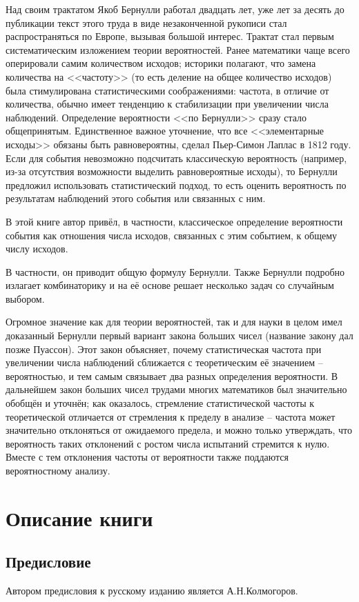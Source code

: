 \documentclass[12pt]{extarticle}
\begin{document}
Над своим трактатом Якоб Бернулли работал двадцать лет, уже лет за десять до публикации текст этого труда в виде незаконченной рукописи стал распространяться по Европе, вызывая большой интерес. 
Трактат стал первым систематическим изложением теории вероятностей. 
Ранее математики чаще всего оперировали самим количеством исходов; историки полагают, что замена количества на <<частоту>> (то есть деление на общее количество исходов) была стимулирована статистическими соображениями: частота, в отличие от количества, обычно имеет тенденцию к стабилизации при увеличении числа наблюдений. Определение вероятности <<по Бернулли>> сразу стало общепринятым.
Единственное важное уточнение, что все <<элементарные исходы>> обязаны быть равновероятны, сделал Пьер-Симон Лаплас в 1812 году. 
Если для события невозможно подсчитать классическую вероятность (например, из-за отсутствия возможности выделить равновероятные исходы), то Бернулли предложил использовать статистический подход, то есть оценить вероятность по результатам наблюдений этого события или связанных с ним.

В этой книге автор привёл, в частности, классическое определение вероятности события как отношения числа исходов, связанных с этим событием, к общему числу исходов. 

В частности, он приводит общую формулу Бернулли.
Также Бернулли подробно излагает комбинаторику и на её основе решает несколько задач со случайным выбором.

Огромное значение как для теории вероятностей, так и для науки в целом имел доказанный Бернулли первый вариант закона больших чисел (название закону дал позже Пуассон). 
Этот закон объясняет, почему статистическая частота при увеличении числа наблюдений сближается с теоретическим её значением -- вероятностью, и тем самым связывает два разных определения вероятности. 
В дальнейшем закон больших чисел трудами многих математиков был значительно обобщён и уточнён; как оказалось, стремление статистической частоты к теоретической отличается от стремления к пределу в анализе -- частота может значительно отклоняться от ожидаемого предела, и можно только утверждать, что вероятность таких отклонений с ростом числа испытаний стремится к нулю. Вместе с тем отклонения частоты от вероятности также поддаются вероятностному анализу.

\newpage
\section{Описание книги}
\subsection{Предисловие}
Автором предисловия к русскому изданию является А.Н.Колмогоров.
\end{document}
